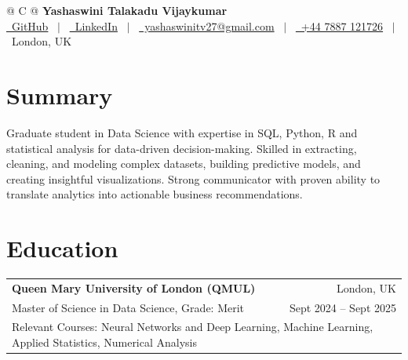 \documentclass[a4paper,10pt]{article}
\begin{document}
\pagestyle{empty} 

\begin{tabularx}{\linewidth}{@{} C @{}}
\Large{\textbf{Yashaswini Talakadu Vijaykumar}} \\[5pt]
\href{https://github.com/YashaswiniTV}{\faGithub\ GitHub} \ $|$ \ 
\href{https://www.linkedin.com/in/yashaswini-tv-62b27b211/}{\faLinkedin\ LinkedIn} \ $|$ \ 
\href{mailto:yashaswinitv27@gmail.com}{\faEnvelope \ yashaswinitv27@gmail.com} \ $|$ \ 
\href{tel:+447887121726}{\faMobile \ +44 7887 121726} \ $|$ \ London, UK \\
\end{tabularx}

\section{Summary}{Graduate student in Data Science with expertise in SQL, Python, R and statistical analysis for data-driven decision-making. Skilled in extracting, cleaning, and modeling complex datasets, building predictive models, and creating insightful visualizations.} {Strong communicator with proven ability to translate analytics into actionable business recommendations.}

\newcommand{\resumeSubheading}[5]{
  \vspace{1pt}\item
    \begin{tabular*}{0.97\textwidth}[t]{l@{\extracolsep{\fill}}r}
      \textbf{#1} & #2 \\
      #3 & #4 \\
      \multicolumn{2}{p{0.97\textwidth}}{#5} \\
    \end{tabular*}\vspace{-5pt}
}

\section{Education}
   \resumeSubheading
        {Queen Mary University of London (QMUL)}{London, UK}
        {Master of Science in Data Science, Grade: Merit}{Sept 2024 -- Sept 2025}
        {Relevant Courses: Neural Networks and Deep Learning, Machine Learning, Applied Statistics, Numerical Analysis}
\end{document}
